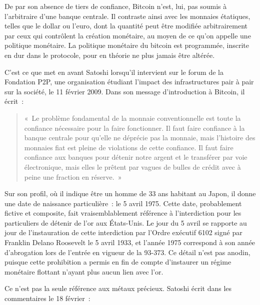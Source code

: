 De par son absence de tiers de confiance, Bitcoin n'est, lui, pas soumis à l'arbitraire d'une banque centrale. Il contraste ainsi avec les monnaies étatiques, telles que le dollar ou l'euro, dont la quantité peut être modifiée arbitrairement par ceux qui contrôlent la création monétaire, au moyen de ce qu'on appelle une politique monétaire. La politique monétaire du bitcoin est programmée, inscrite en dur dans le protocole, pour en théorie ne plus jamais être altérée.

C'est ce que met en avant Satoshi lorsqu'il intervient sur le forum de la Fondation P2P, une organisation étudiant l'impact des infrastructures pair à pair sur la société, le 11 février 2009. Dans son message d'introduction à Bitcoin, il écrit~:

\begin{quote}
«~Le problème fondamental de la monnaie conventionnelle est toute la confiance nécessaire pour la faire fonctionner. Il faut faire confiance à la banque centrale pour qu'elle ne déprécie pas la monnaie, mais l'histoire des monnaies fiat est pleine de violations de cette confiance. Il faut faire confiance aux banques pour détenir notre argent et le transférer par voie électronique, mais elles le prêtent par vagues de bulles de crédit avec à peine une fraction en réserve.~»
\end{quote}

Sur son profil, où il indique être un homme de 33 ans habitant au Japon, il donne une date de naissance particulière~: le 5 avril 1975. Cette date, probablement fictive et composite, fait vraisemblablement référence à l'interdiction pour les particuliers de détenir de l'or aux États-Unis. Le jour du 5 avril se rapporte au jour de l'instauration de cette interdiction par l'Ordre exécutif 6102 signé par Franklin Delano Roosevelt le 5 avril 1933, et l'année 1975 correspond à son année d'abrogation lors de l'entrée en vigueur de la  93-373. Ce détail n'est pas anodin, puisque cette prohibition a permis en fin de compte d'instaurer un régime monétaire flottant n'ayant plus aucun lien avec l'or.

Ce n'est pas la seule référence aux métaux précieux. Satoshi écrit dans les commentaires le 18 février~:


